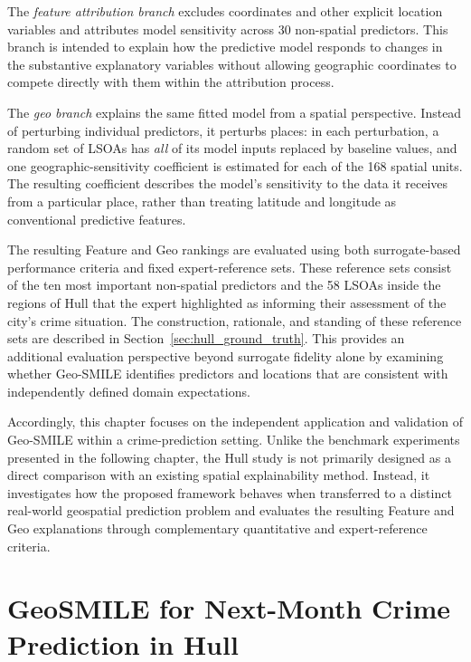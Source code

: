 The \emph{feature attribution branch} excludes coordinates and other explicit location variables and attributes model sensitivity across 30 non-spatial predictors. This branch is intended to explain how the predictive model responds to changes in the substantive explanatory variables without allowing geographic coordinates to compete directly with them within the attribution process.

The \emph{geo branch} explains the same fitted model from a spatial perspective. Instead of perturbing individual predictors, it perturbs places: in each perturbation, a random set of LSOAs has \emph{all} of its model inputs replaced by baseline values, and one geographic-sensitivity coefficient is estimated for each of the 168 spatial units. The resulting coefficient describes the model's sensitivity to the data it receives from a particular place, rather than treating latitude and longitude as conventional predictive features.

The resulting Feature and Geo rankings are evaluated using both surrogate-based performance criteria and fixed expert-reference sets. These reference sets consist of the ten most important non-spatial predictors and the 58 LSOAs inside the regions of Hull that the expert highlighted as informing their assessment of the city's crime situation. The construction, rationale, and standing of these reference sets are described in Section~\ref{sec:hull_ground_truth}. This provides an additional evaluation perspective beyond surrogate fidelity alone by examining whether Geo-SMILE identifies predictors and locations that are consistent with independently defined domain expectations.

Accordingly, this chapter focuses on the independent application and validation of Geo-SMILE within a crime-prediction setting. Unlike the benchmark experiments presented in the following chapter, the Hull study is not primarily designed as a direct comparison with an existing spatial explainability method. Instead, it investigates how the proposed framework behaves when transferred to a distinct real-world geospatial prediction problem and evaluates the resulting Feature and Geo explanations through complementary quantitative and expert-reference criteria.

\section{GeoSMILE for Next-Month Crime Prediction in Hull}
\label{sec:hull_first_independent_experiment}

